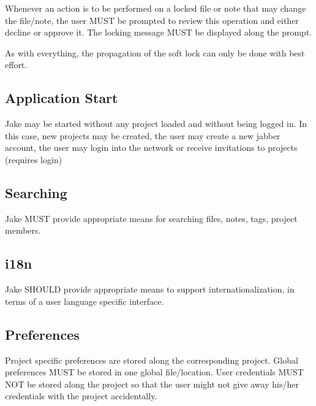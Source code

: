 Whenever an action is to be performed on a locked file or note that may change the file/note, the user MUST be prompted to review this operation and either decline or approve it. The locking message MUST be displayed along the prompt.

As with everything, the propagation of the soft lock can only be done with best effort.


\subsection{Application Start}
Jake may be started without any project loaded and without being logged in. In this case, new projects may be created, the user may create a new jabber account, the user may login into the network or receive invitations to projects (requires login)

\subsection{Searching}
Jake MUST provide appropriate means for searching files, notes, tags, project members.

\subsection{i18n}
Jake SHOULD provide appropriate means to support internationalization, in terms of a user language specific interface.

\subsection{Preferences}
Project specific preferences are stored along the corresponding project. Global preferences MUST be stored in one global file/location. User credentials MUST NOT be stored along the project so that the user might not give away his/her credentials with the project accidentally.

